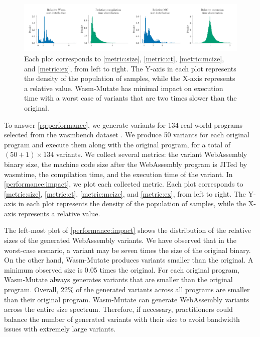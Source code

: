 \documentclass[a4paper,fleqn]{cas-dc}
\newcommand{\tool}{{\sc Wasm-Mutate}\xspace}
\newcommand{\Wasm}{WebAssembly\xspace}
\newenvironment{revision1}{\color{blue}}{}
\begin{document}
\begin{revision1}
\subsection{\rqperformance}

\begin{figure}
    \centering
    \includegraphics[width=\linewidth]{plots/rq4/plots.pdf}
    \caption{Each plot corresponds to \autoref{metric:size}, \autoref{metric:ct}, \autoref{metric:mcize}, and \autoref{metric:ex}, from left to right.
The Y-axis in each plot represents the density of the population of samples, while the X-axis represents a relative value. \tool has minimal impact on execution time with a worst case of variants that are two times slower than the original. }
  \label{performance:impact}
\end{figure}

To answer \ref{rq:performance}, we generate variants for 134 real-world programs selected from the wasmbench dataset \cite{hilbig2021empirical}.
We produce 50 variants for each original program and execute them along with the original program, for a total of $(50 + 1)\times134$ variants.
We collect several metrics: the variant \Wasm binary size, the machine code size after the \Wasm program is JITed by wasmtime, the compilation time, and the execution time of the variant.
In \autoref{performance:impact}, we plot each collected metric.
Each plot corresponds to \autoref{metric:size}, \autoref{metric:ct}, \autoref{metric:mcize}, and \autoref{metric:ex}, from left to right.
The Y-axis in each plot represents the density of the population of samples, while the X-axis represents a relative value.


The left-most plot of \autoref{performance:impact} shows the distribution of the relative sizes of the generated \Wasm variants.
We have observed that in the worst-case scenario, a variant may be seven times the size of the original binary.
On the other hand, \tool produces variants smaller than the original.
A minimum observed size is 0.05 times the original.
For each original program, \tool always generates variants that are smaller than the original program.
Overall, 22\% of the generated variants across all programs are smaller than their original program.
\tool can generate \Wasm variants across the entire size spectrum.
Therefore, if necessary, practitioners could balance the number of generated variants with their size to avoid bandwidth issues with extremely large variants.


\end{revision1}
\end{document}
